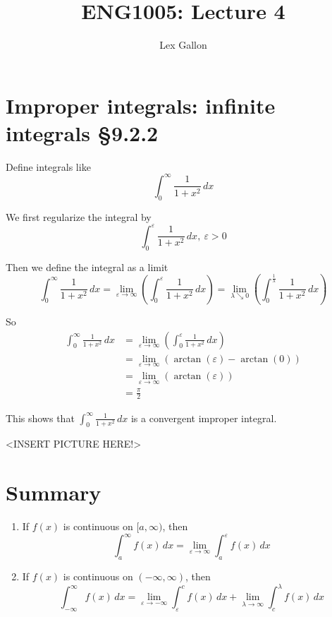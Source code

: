 \documentclass[11pt]{article}
\begin{document}
\title{ENG1005: Lecture 4}
\author{Lex Gallon}
\maketitle

\tableofcontents

\section{Improper integrals: infinite integrals §9.2.2}
Define integrals like
\[ \int_0^\infty \frac{1}{1+x^2} \,dx \]

We first regularize the integral by
\[ \int_0^\varepsilon  \frac{1}{1+x^2} \,dx,\  \varepsilon>0 \]

Then we define the integral as a limit
\[ \int_0^\infty \frac{1}{1+x^2} \,dx = \lim_{\varepsilon\rightarrow\infty } \left( \int_0^\varepsilon  \frac{1}{1+x^2} \,dx \right) = \lim_{\lambda\searrow 0} \left( \int_0^{\frac{1}{\lambda}}  \frac{1}{1+x^2} \,dx \right) \]

So
\begin{align*}
\int_0^\infty \frac{1}{1+x^2} \,dx &= \lim_{\varepsilon\rightarrow\infty } \left( \int_0^\varepsilon  \frac{1}{1+x^2} \,dx \right) \\
 &=  \lim_{\varepsilon\rightarrow\infty } \left( \arctan(\varepsilon) - \arctan(0) \right) \\
 &=  \lim_{\varepsilon\rightarrow\infty } \left( \arctan(\varepsilon) \right) \\
 &= \frac{\pi}{2} 
\end{align*}

This shows that $\int_0^\infty \frac{1}{1+x^2} \,dx$ is a convergent improper integral.

<INSERT PICTURE HERE!>

\section{Summary}
\begin{enumerate}
\item If $f(x)$ is continuous on $[a, \infty)$, then
\[ \int_a^\infty f(x) \,dx = \lim_{\varepsilon\rightarrow\infty} \int_a^\varepsilon f(x) \,dx \]

\item If $f(x)$ is continuous on $(-\infty, \infty)$, then
\[ \int_{-\infty}^\infty f(x) \,dx = \lim_{\varepsilon\rightarrow -\infty} \int_\varepsilon^c f(x) \,dx + \lim_{\lambda\rightarrow \infty} \int_c^\lambda f(x) \,dx  \]
\end{enumerate}
\end{document}
